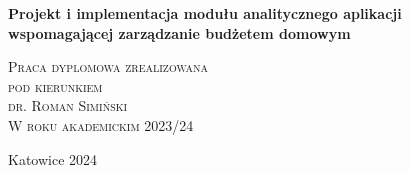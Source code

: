 \documentclass[a4paper, 10pt, twoside, openright]{report}
\newcommand{\customstyletitle}[1]{\Huge{\textbf{#1}}}
\newcommand{\HRule}{\rule{\linewidth}{0.5mm}} %
\begin{document}
\begin{large}
\begin{titlepage}
    \bigskip

	\begin{center}
	{\customstyletitle{Projekt i implementacja modułu analitycznego aplikacji wspomagającej zarządzanie budżetem domowym}}\\[0.4cm] 
    \end{center}
	
	\bigskip
    \begin{flushright}
        \textsc{Praca dyplomowa zrealizowana}\\[0cm]
        \textsc{pod kierunkiem}\\[0cm]
        \textsc{dr. Roman Simiński}\\[0cm]
        \textsc{W roku akademickim 2023/24}\\[0cm]
    \end{flushright}
 
	\vfill                  %
	\begin{center}
    {Katowice 2024}\\	    %
	\end{center}
\end{titlepage}

\renewcommand*\contentsname{Spis treści}
\tableofcontents                    %




\end{large}
\end{document}
